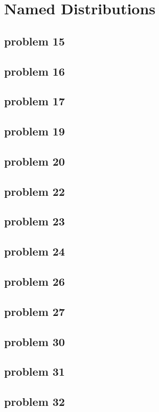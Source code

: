 \section{Named Distributions}

\subsection{problem 15}


\subsection{problem 16}


\subsection{problem 17}


\subsection{problem 19}


\subsection{problem 20}


\subsection{problem 22}


\subsection{problem 23}


\subsection{problem 24}


\subsection{problem 26}


\subsection{problem 27}


\subsection{problem 30}


\subsection{problem 31}


\subsection{problem 32}
